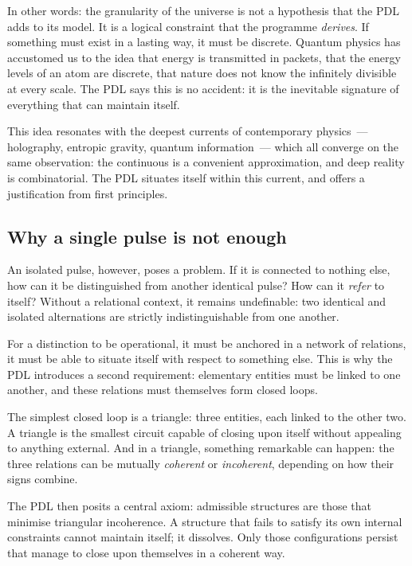 \documentclass[12pt, a4paper, openright]{book}
\begin{document}
\medskip

In other words: the granularity of the universe is not a hypothesis that the PDL adds to its model. It is a logical constraint that the programme \emph{derives}. If something must exist in a lasting way, it must be discrete. Quantum physics has accustomed us to the idea that energy is transmitted in packets, that the energy levels of an atom are discrete, that nature does not know the infinitely divisible at every scale. The PDL says this is no accident: it is the inevitable signature of everything that can maintain itself.

\medskip

This idea resonates with the deepest currents of contemporary physics~--- holography, entropic gravity, quantum information~--- which all converge on the same observation: the continuous is a convenient approximation, and deep reality is combinatorial. The PDL situates itself within this current, and offers a justification from first principles.

\subsection*{Why a single pulse is not enough}

An isolated pulse, however, poses a problem. If it is connected to nothing else, how can it be distinguished from another identical pulse? How can it \emph{refer} to itself? Without a relational context, it remains undefinable: two identical and isolated alternations are strictly indistinguishable from one another.

\medskip

For a distinction to be operational, it must be anchored in a network of relations, it must be able to situate itself with respect to something else. This is why the PDL introduces a second requirement: elementary entities must be linked to one another, and these relations must themselves form closed loops.

\medskip

The simplest closed loop is a triangle: three entities, each linked to the other two. A triangle is the smallest circuit capable of closing upon itself without appealing to anything external. And in a triangle, something remarkable can happen: the three relations can be mutually \emph{coherent} or \emph{incoherent}, depending on how their signs combine.

\medskip

The PDL then posits a central axiom: admissible structures are those that minimise triangular incoherence. A structure that fails to satisfy its own internal constraints cannot maintain itself; it dissolves. Only those configurations persist that manage to close upon themselves in a coherent way.
\end{document}
